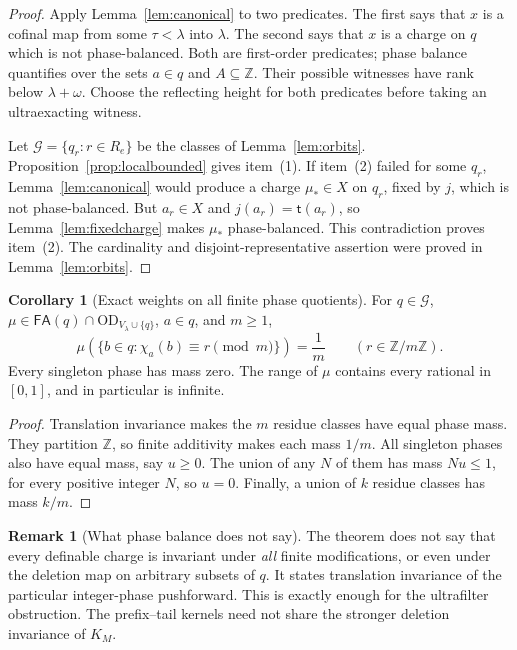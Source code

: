 \documentclass[11pt,letterpaper]{article}
\theoremstyle{definition}
\newtheorem{corollary}[definition]{Corollary}
\newtheorem{remark}[definition]{Remark}
\newcommand{\OD}{\mathrm{OD}}
\newcommand{\FA}{\mathsf{FA}}
\newcommand{\ODq}{\OD_{V_\lambda\cup\{q\}}}
\newcommand{\tail}{\mathsf t}
\begin{document}
\begin{proof}
Apply Lemma~\ref{lem:canonical} to two predicates. The first says that $x$ is a cofinal map from some $\tau<\lambda$ into $\lambda$. The second says that $x$ is a charge on $q$ which is not phase-balanced. Both are first-order predicates; phase balance quantifies over the sets $a\in q$ and $A\subseteq\mathbb Z$. Their possible witnesses have rank below $\lambda+\omega$. Choose the reflecting height for both predicates before taking an ultraexacting witness.

Let $\mathcal G=\{q_r:r\in R_e\}$ be the classes of Lemma~\ref{lem:orbits}. Proposition~\ref{prop:localbounded} gives item~(1). If item~(2) failed for some $q_r$, Lemma~\ref{lem:canonical} would produce a charge $\mu_*\in X$ on $q_r$, fixed by $j$, which is not phase-balanced. But $a_r\in X$ and $j(a_r)=\tail(a_r)$, so Lemma~\ref{lem:fixedcharge} makes $\mu_*$ phase-balanced. This contradiction proves item~(2). The cardinality and disjoint-representative assertion were proved in Lemma~\ref{lem:orbits}.
\end{proof}

\begin{corollary}[Exact weights on all finite phase quotients]\label{cor:residues}
For $q\in\mathcal G$, $\mu\in\FA(q)\cap\ODq$, $a\in q$, and $m\ge1$,
\begin{equation}\label{eq:residues}
 \mu(\{b\in q:\chi_a(b)\equiv r\pmod m\})=\frac1m
 \qquad(r\in\mathbb Z/m\mathbb Z).
\end{equation}
Every singleton phase has mass zero. The range of $\mu$ contains every rational in $[0,1]$, and in particular is infinite.
\end{corollary}

\begin{proof}
Translation invariance makes the $m$ residue classes have equal phase mass. They partition $\mathbb Z$, so finite additivity makes each mass $1/m$. All singleton phases also have equal mass, say $u\ge0$. The union of any $N$ of them has mass $Nu\le1$, for every positive integer $N$, so $u=0$. Finally, a union of $k$ residue classes has mass $k/m$.
\end{proof}

\begin{remark}[What phase balance does not say]
The theorem does not say that every definable charge is invariant under \emph{all} finite modifications, or even under the deletion map on arbitrary subsets of $q$. It states translation invariance of the particular integer-phase pushforward. This is exactly enough for the ultrafilter obstruction. The prefix--tail kernels need not share the stronger deletion invariance of $K_M$.
\end{remark}
\end{document}
